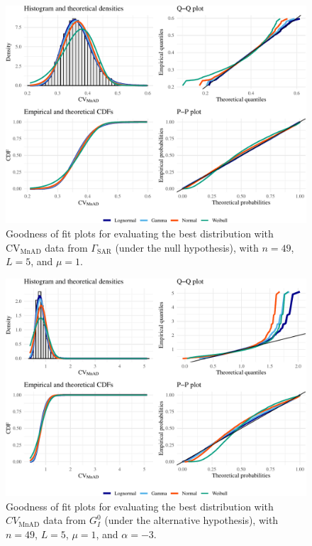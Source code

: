 \begin{figure}[H]

{\centering \includegraphics[width=0.8\linewidth]{../../Figures/PDF/Plot_MnADmedian_gamma-1} 

}

\caption{Goodness of fit plots for evaluating the best distribution with $\text{CV}_{\text{MnAD}}$ data from $\Gamma_{\text{SAR}}$ (under the null hypothesis), with  $n=49$, $L=5$, and $\mu=1$.}\label{fig:Plot_MnADmedian_gamma}
\end{figure}
\begin{figure}[H]

{\centering \includegraphics[width=0.8\linewidth]{../../Figures/PDF/Plot_madmed_gi0_MnADmedian-1} 

}

\caption{Goodness of fit plots for evaluating the best distribution with $CV_{\text{MnAD}}$ data from $G_I^0$ (under the alternative hypothesis), with  $n=49$, $L=5$, $\mu=1$, and $\alpha=-3$.}\label{fig:Plot_madmed_gi0_MnADmedian}
\end{figure}

